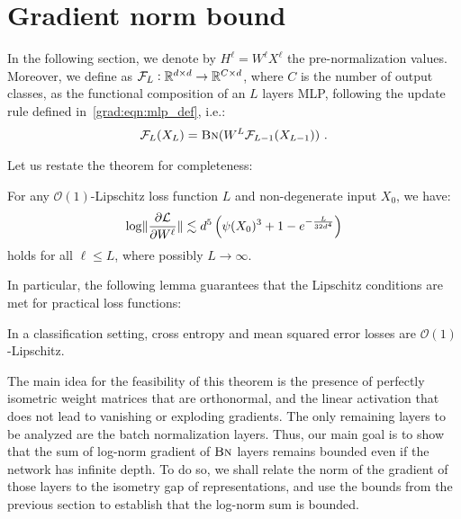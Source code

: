  \section{Gradient norm bound}
\label{grad:sec:proof_grad_norm}
In the following section, we denote by $H^\ell = W^\ell X^\ell$ the pre-normalization values. Moreover, we define as $\mathcal{F}_L: \mathbb{R}^{d \times d} \to \mathbb{R}^{C \times d}$, where $C$ is the number of output classes, as the functional composition of an $L$ layers MLP, following the update rule defined in~\eqref{grad:eqn:mlp_def}, i.e.:
\begin{align}
    \mathcal{F}_L(X_{L}) = \text{\sc{Bn}}(W^L \mathcal{F}_{L-1}(X_{L-1}))~.
\end{align}

Let us restate the theorem for completeness:
\begin{theorem}\label{grad:thm:explosion_appendix} For any $\mathcal{O}(1)$-Lipschitz loss function $L$ and non-degenerate input $X_0$, we have:
    \begin{align}
     \log \lVert\frac{\partial \mathcal{L}}{\partial W^\ell}\rVert \lesssim d^5 \left(\psi(X_0)^3 + 1-e^{-\frac{L}{32d^4}}\right)
    \end{align}
holds for all $\ell \leq L$, where possibly $L \to \infty$.
\end{theorem}
In particular, the following lemma guarantees that the Lipschitz conditions are met for practical loss functions:
\begin{lemma}
    \label{grad:lem:lipschitz}
    In a classification setting, cross entropy and mean squared error losses are $\mathcal{O}(1)$-Lipschitz.
\end{lemma}

The main idea for the feasibility of this theorem is the presence of perfectly isometric weight matrices that are orthonormal, and the linear activation that does not lead to vanishing or exploding gradients. The only remaining layers to be analyzed are the batch normalization layers. Thus, our main goal is to show that the sum of log-norm gradient of $\text{\sc{Bn}}$ layers remains bounded even if the network has infinite depth. To do so, we shall relate the norm of the gradient of those layers to the isometry gap of representations, and use the bounds from the previous section to establish that the log-norm sum is bounded.


